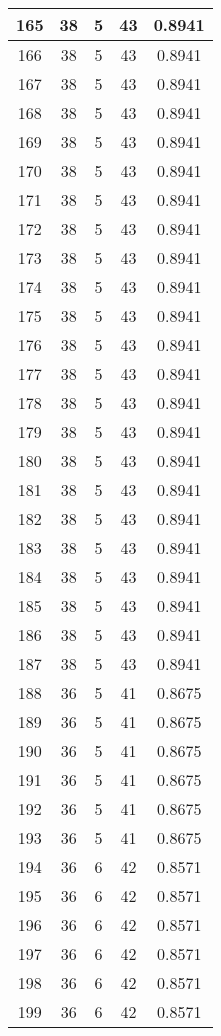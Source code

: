 \documentclass[letterpaper, 12pt]{article}
\begin{document}
\begin{longtable}{|c|c|c|c|c|}
\hline
165 & 38 & 5 & 43 & 0.8941 \\
\hline
166 & 38 & 5 & 43 & 0.8941 \\
\hline
167 & 38 & 5 & 43 & 0.8941 \\
\hline
168 & 38 & 5 & 43 & 0.8941 \\
\hline
169 & 38 & 5 & 43 & 0.8941 \\
\hline
170 & 38 & 5 & 43 & 0.8941 \\
\hline
171 & 38 & 5 & 43 & 0.8941 \\
\hline
172 & 38 & 5 & 43 & 0.8941 \\
\hline
173 & 38 & 5 & 43 & 0.8941 \\
\hline
174 & 38 & 5 & 43 & 0.8941 \\
\hline
175 & 38 & 5 & 43 & 0.8941 \\
\hline
176 & 38 & 5 & 43 & 0.8941 \\
\hline
177 & 38 & 5 & 43 & 0.8941 \\
\hline
178 & 38 & 5 & 43 & 0.8941 \\
\hline
179 & 38 & 5 & 43 & 0.8941 \\
\hline
180 & 38 & 5 & 43 & 0.8941 \\
\hline
181 & 38 & 5 & 43 & 0.8941 \\
\hline
182 & 38 & 5 & 43 & 0.8941 \\
\hline
183 & 38 & 5 & 43 & 0.8941 \\
\hline
184 & 38 & 5 & 43 & 0.8941 \\
\hline
185 & 38 & 5 & 43 & 0.8941 \\
\hline
186 & 38 & 5 & 43 & 0.8941 \\
\hline
187 & 38 & 5 & 43 & 0.8941 \\
\hline
188 & 36 & 5 & 41 & 0.8675 \\
\hline
189 & 36 & 5 & 41 & 0.8675 \\
\hline
190 & 36 & 5 & 41 & 0.8675 \\
\hline
191 & 36 & 5 & 41 & 0.8675 \\
\hline
192 & 36 & 5 & 41 & 0.8675 \\
\hline
193 & 36 & 5 & 41 & 0.8675 \\
\hline
194 & 36 & 6 & 42 & 0.8571 \\
\hline
195 & 36 & 6 & 42 & 0.8571 \\
\hline
196 & 36 & 6 & 42 & 0.8571 \\
\hline
197 & 36 & 6 & 42 & 0.8571 \\
\hline
198 & 36 & 6 & 42 & 0.8571 \\
\hline
199 & 36 & 6 & 42 & 0.8571 \\
\hline
\end{longtable}
\end{document}
